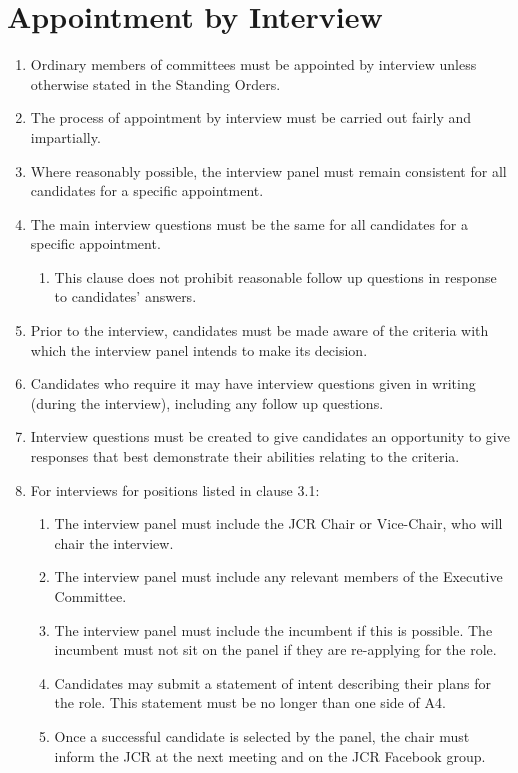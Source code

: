 \documentclass[12pt]{article}  %
\begin{document}
\section{Appointment by Interview}
\begin{enumerate}
    \item Ordinary members of committees must be appointed by interview unless otherwise stated in the Standing Orders.
    \item The process of appointment by interview must be carried out fairly and impartially.
    \item Where reasonably possible, the interview panel must remain consistent for all candidates for a specific appointment.
    \item The main interview questions must be the same for all candidates for a specific appointment.
    \begin{enumerate}
        \item This clause does not prohibit reasonable follow up questions in response to candidates’ answers.
    \end{enumerate}
    \item Prior to the interview, candidates must be made aware of the criteria with which the interview panel intends to make its decision.
    \item Candidates who require it may have interview questions given in writing (during the interview), including any follow up questions.
    \item Interview questions must be created to give candidates an opportunity to give responses that best demonstrate their abilities relating to the criteria.
    \item For interviews for positions listed in clause 3.1:
    \begin{enumerate}
        \item The interview panel must include the JCR Chair or Vice-Chair, who will chair the interview.
        \item The interview panel must include any relevant members of the Executive Committee.
        \item The interview panel must include the incumbent if this is possible. The incumbent must not sit on the panel if they are re-applying for the role.
        \item Candidates may submit a statement of intent describing their plans for the role. This statement must be no longer than one side of A4.
        \item Once a successful candidate is selected by the panel, the chair must inform the JCR at the next meeting and on the JCR Facebook group.

\end{enumerate}
\end{enumerate}
\end{document}
